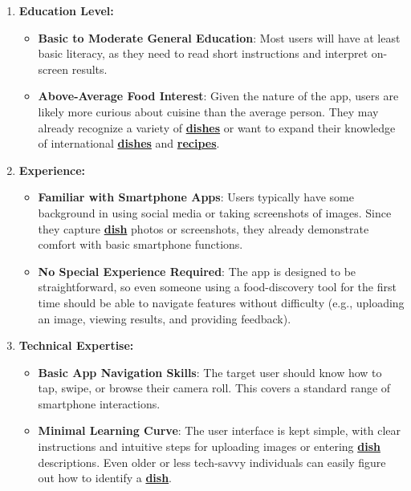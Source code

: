 \documentclass[]{article}
\begin{document}
\begin{enumerate}
    \item \textbf{Education Level:}
    \begin{itemize}
        \item \textbf{Basic to Moderate General Education}: Most users will have at least basic literacy, as they need to read short instructions and interpret on-screen results.
        \item \textbf{Above-Average Food Interest}: Given the nature of the app, users are likely more curious about cuisine than the average person. They may already recognize a variety of \hyperref[Dish]{\textbf{dishes}} or want to expand their knowledge of international \hyperref[Dish]{\textbf{dishes}} and \hyperref[Recipe]{\textbf{recipes}}.
    \end{itemize}
    
    \item \textbf{Experience:}
    \begin{itemize}
        \item \textbf{Familiar with Smartphone Apps}: Users typically have some background in using social media or taking screenshots of images. Since they capture \hyperref[Dish]{\textbf{dish}} photos or screenshots, they already demonstrate comfort with basic smartphone functions.
        \item \textbf{No Special Experience Required}: The app is designed to be straightforward, so even someone using a food-discovery tool for the first time should be able to navigate features without difficulty (e.g., uploading an image, viewing results, and providing feedback).
    \end{itemize}
    
    \item \textbf{Technical Expertise:}
    \begin{itemize}
        \item \textbf{Basic App Navigation Skills}: The target user should know how to tap, swipe, or browse their camera roll. This covers a standard range of smartphone interactions.
        \item \textbf{Minimal Learning Curve}: The user interface is kept simple, with clear instructions and intuitive steps for uploading images or entering \hyperref[Dish]{\textbf{dish}} descriptions. Even older or less tech-savvy individuals can easily figure out how to identify a \hyperref[Dish]{\textbf{dish}}.
    \end{itemize}
\end{enumerate}
\end{document}
